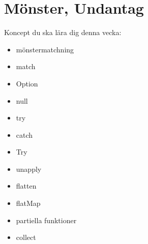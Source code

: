 \chapter{Mönster, Undantag}\label{chapter:W08}
Koncept du ska lära dig denna vecka:
\begin{multicols}{2}\begin{itemize}[nosep,label={$\square$},leftmargin=*]
\item mönstermatchning
\item match
\item Option
\item null
\item try
\item catch
\item Try
\item unapply
\item flatten
\item flatMap
\item partiella funktioner
\item collect\end{itemize}\end{multicols}
